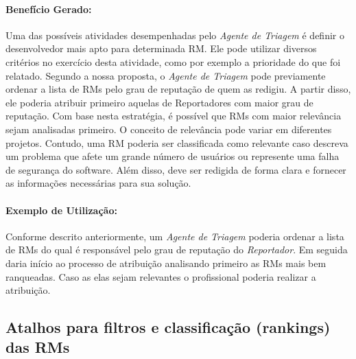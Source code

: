 
\paragraph{Benefício Gerado:}
\label{par:papéis_afetados_s03}

Uma das possíveis atividades desempenhadas pelo \textit{Agente de Triagem} é
definir o desenvolvedor mais apto para determinada RM\@. Ele pode utilizar
diversos critérios no exercício desta atividade, como por exemplo a prioridade
do que foi relatado. Segundo a nossa proposta, o \textit{Agente de Triagem} pode
previamente ordenar a lista de RMs pelo grau de reputação de quem as redigiu. A
partir disso, ele poderia atribuir primeiro aquelas de Reportadores com maior
grau de reputação. Com base nesta estratégia, é possível que RMs com maior
relevância sejam analisadas primeiro. O conceito de relevância pode variar em
diferentes projetos. Contudo, uma RM poderia ser classificada como relevante
caso descreva um problema que afete um grande número de usuários ou represente
uma falha de segurança do software. Além disso, deve ser redigida de forma clara
e fornecer as informações necessárias para sua solução.

\paragraph{Exemplo de Utilização:}
\label{par:exemplo_de_utilização_s03}

Conforme descrito anteriormente, um \textit{Agente de Triagem} poderia ordenar a
lista de RMs do qual é responsável pelo grau de reputação do
\textit{Reportador}. Em seguida daria início ao processo de atribuição
analisando primeiro as RMs mais bem ranqueadas. Caso as elas sejam relevantes o
profissional poderia realizar a atribuição.

\subsection{Atalhos para filtros e classificação (rankings) das RMs}
\label{sub:histórico_das_ùltimas_rm_s}

